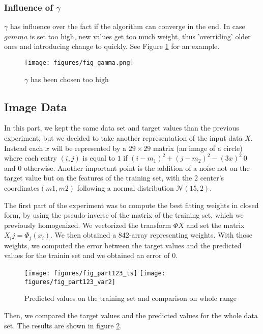 \subsubsection{Influence of $\gamma$ }
 $\gamma$ has influence over the fact if the algorithm can converge in the end. In case $gamma$ is set too high, new values get too much weight, thus 'overriding' older ones and introducing change to quickly. See Figure \ref {fig:gamma} for an example.

\begin{figure}[h]
\begin{center}
\centering
\texttt{[image: figures/fig\_gamma.png]}
\end{center}
\caption{\label{fig:gamma} $\gamma$ has been chosen too high }
\end{figure}


\newpage
\subsection{Image Data}
In this part, we kept the same data set and target values than the previous experiment, but we decided to take another representation of the input data $X$. Instead each $x$ will be represented by a $29\times29$ matrix (an image of a circle) where each entry $(i,j)$ is equal to $1$ if $(i-m_1)^2+(j-m_2)^2-(3x)^2 \> 0$ and $0$ otherwise. Another important point is the addition of a noise not on the target value but on the features of the training set, with the 2 center's coordinates$ (m1,m2)$ following a normal distribution $\mathcal{N}(15,2)$.

The first part of the experiment was to compute the best fitting weights in closed form, by using the pseudo-inverse of the matrix of the training set, which we previously homogenized. We vectorized the transform $\Phi{X}$ and set the matrix $X_ij = \Phi_j(x_i)$. We then obtained a 842-array representing weights. With those weights, we computed the error between the target values and the predicted values for the trainin set and we obtained an error of 0.
\begin{figure}  
\centering
	\texttt{[image: figures/fig\_part123\_ts]}
	\texttt{[image: figures/fig\_part123\_var2]}
	\caption{Predicted values on the training set and comparison on whole range}
	\label{reg:test:predicted}
\end{figure}
Then, we compared the target values and the predicted values for the whole data set. The results are shown in figure \ref{reg:test:predicted}.
	

